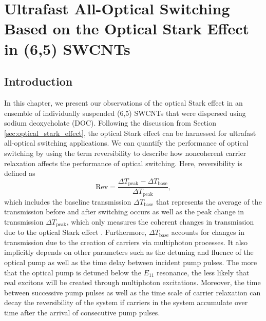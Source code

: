 \chapter{Ultrafast All-Optical Switching Based on the Optical Stark Effect in (6,5) SWCNTs}

\section{Introduction}



In this chapter, we present our observations of the optical Stark effect in an ensemble of individually suspended (6,5) SWCNTs that were dispersed using sodium deoxycholate (DOC). Following the discussion from Section \ref{sec:optical_stark_effect}, the optical Stark effect can be harnessed for ultrafast all-optical switching applications. We can quantify the performance of optical switching by using the term reversibility to describe how noncoherent carrier relaxation affects the performance of optical switching. Here, reversibility is defined as
%
\begin{equation}
 	\text{Rev} = \dfrac{\Delta T_\text{peak} - \Delta T_\text{base}}{\Delta T_\text{peak}},
  \label{eq:kira_reversibility}
\end{equation}
%
which includes the baseline transmission $\Delta T_\text{base}$ that represents the average of the transmission before and after switching occurs as well as the peak change in transmission $\Delta T_\text{peak}$, which only measures the coherent changes in transmission due to the optical Stark effect \cite{mack2019}. Furthermore, $\Delta T_\text{base}$ accounts for changes in transmission due to the creation of carriers via multiphoton processes. It also implicitly depends on other parameters such as the detuning and fluence of the optical pump as well as the time delay between incident pump pulses. The more that the optical pump is detuned below the $E_{11}$ resonance, the less likely that real excitons will be created through multiphoton excitations. Moreover, the time between successive pump pulses as well as the time scale of carrier relaxation can decay the reversibility of the system if carriers in the system accumulate over time after the arrival of consecutive pump pulses.

